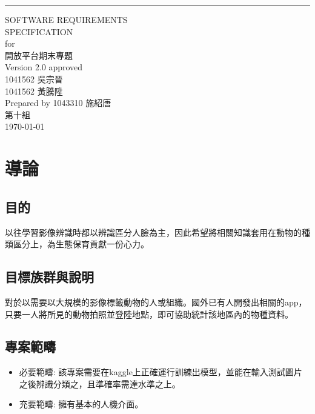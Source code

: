 \documentclass{scrreprt}
\date{}
\def\myversion{2.0 }
\begin{document}
\begin{flushright}
    \rule{14cm}{5pt}\vskip1cm
    \begin{bfseries}
        \Huge{SOFTWARE REQUIREMENTS\\ SPECIFICATION}\\
        \vspace{1.8cm}
        for\\
        \vspace{1.8cm}
        開放平台期末專題\\
        \vspace{1.8cm}
        \LARGE{Version \myversion approved}\\
		1041562 吳宗晉\\
        1041562 黃騰陞\\
        Prepared by 1043310 施紹唐\\
        \vspace{1.8cm}
        第十組\\
        \vspace{1.8cm}
        \today\\
    \end{bfseries}
\end{flushright}

\tableofcontents

\chapter{導論}
\section{目的}
以往學習影像辨識時都以辨識區分人臉為主，因此希望將相關知識套用在動物的種類區分上，為生態保育貢獻一份心力。

\section{目標族群與說明}
對於以需要以大規模的影像標籤動物的人或組織。國外已有人開發出相關的app，只要一人將所見的動物拍照並登陸地點，即可協助統計該地區內的物種資料。

\section{專案範疇}
\begin{itemize}
\item 必要範疇: 該專案需要在kaggle上正確運行訓練出模型，並能在輸入測試圖片之後辨識分類之，且準確率需達水準之上。
\item 充要範疇: 擁有基本的人機介面。
\end{itemize}
\end{document}
